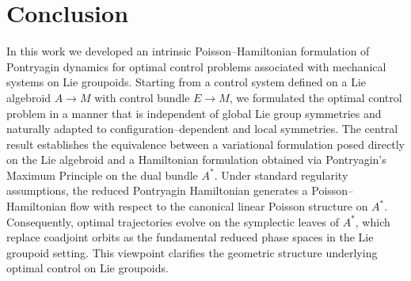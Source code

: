 \documentclass{article}
\begin{document}








\section*{Conclusion}

In this work we developed an intrinsic Poisson--Hamiltonian formulation of Pontryagin dynamics for optimal control problems associated with mechanical systems on Lie groupoids. Starting from a control system defined on a Lie algebroid \(A \to M\) with control bundle \(E \to M\), we formulated the optimal control problem in a manner that is independent of global Lie group symmetries and naturally adapted to configuration--dependent and local symmetries.
The central result establishes the equivalence between a variational formulation posed directly on the Lie algebroid and a Hamiltonian formulation obtained via Pontryagin’s Maximum Principle on the dual bundle \(A^*\). Under standard regularity assumptions, the reduced Pontryagin Hamiltonian generates a Poisson--Hamiltonian flow with respect to the canonical linear Poisson structure on \(A^*\). Consequently, optimal trajectories evolve on the symplectic leaves of \(A^*\), which replace coadjoint orbits as the fundamental reduced phase spaces in the Lie groupoid setting.
This viewpoint clarifies the geometric structure underlying optimal control on Lie groupoids. 
\end{document}
